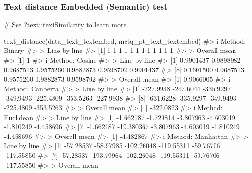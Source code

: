 \documentclass[
  12pt,
  a4paper,
  oneside]{tesesusp}
\newenvironment{Shaded}{\begin{snugshade}}{\end{snugshade}}
\newcommand{\CommentTok}[1]{\textcolor[rgb]{0.37,0.37,0.37}{#1}}
\newcommand{\FunctionTok}[1]{\textcolor[rgb]{0.28,0.35,0.67}{#1}}
\newcommand{\NormalTok}[1]{\textcolor[rgb]{0.00,0.23,0.31}{#1}}
\begin{document}
\hypertarget{text-distance-embedded-semantic-test-1}{%
\subsubsection{Text distance \textbar{} Embedded (Semantic)
test}\label{text-distance-embedded-semantic-test-1}}

\begin{Shaded}
\begin{Highlighting}[numbers=left,,]
\CommentTok{\# See \textasciigrave{}?text::textSimilarity\textasciigrave{} to learn more.}

\FunctionTok{text\_distance}\NormalTok{(data\_text\_textembed, mctq\_pt\_text\_textembed)}
\CommentTok{\#\textgreater{} i Method: Binary}
\CommentTok{\#\textgreater{} \textgreater{} Line by line}
\CommentTok{\#\textgreater{}  [1] 1 1 1 1 1 1 1 1 1 1 1 1}
\CommentTok{\#\textgreater{} \textgreater{} Overall mean}
\CommentTok{\#\textgreater{} [1] 1}
\CommentTok{\#\textgreater{} i Method: Cosine}
\CommentTok{\#\textgreater{} \textgreater{} Line by line}
\CommentTok{\#\textgreater{}  [1] 0.9901437 0.9898982 0.9687513 0.9575260 0.9882873 0.9598702 0.9901437}
\CommentTok{\#\textgreater{}  [8] 0.1601500 0.9687513 0.9575260 0.9882873 0.9598702}
\CommentTok{\#\textgreater{} \textgreater{} Overall mean}
\CommentTok{\#\textgreater{} [1] 0.9066005}
\CommentTok{\#\textgreater{} i Method: Canberra}
\CommentTok{\#\textgreater{} \textgreater{} Line by line}
\CommentTok{\#\textgreater{}  [1] {-}227.9938 {-}247.6044 {-}335.9297 {-}349.9493 {-}225.4809 {-}353.5263 {-}227.9938}
\CommentTok{\#\textgreater{}  [8] {-}631.6228 {-}335.9297 {-}349.9493 {-}225.4809 {-}353.5263}
\CommentTok{\#\textgreater{} \textgreater{} Overall mean}
\CommentTok{\#\textgreater{} [1] {-}322.0823}
\CommentTok{\#\textgreater{} i Method: Euclidean}
\CommentTok{\#\textgreater{} \textgreater{} Line by line}
\CommentTok{\#\textgreater{}  [1]  {-}1.662187  {-}1.729814  {-}3.807963  {-}4.603019  {-}1.810249  {-}4.458696}
\CommentTok{\#\textgreater{}  [7]  {-}1.662187 {-}19.380367  {-}3.807963  {-}4.603019  {-}1.810249  {-}4.458696}
\CommentTok{\#\textgreater{} \textgreater{} Overall mean}
\CommentTok{\#\textgreater{} [1] {-}4.482867}
\CommentTok{\#\textgreater{} i Method: Manhattan}
\CommentTok{\#\textgreater{} \textgreater{} Line by line}
\CommentTok{\#\textgreater{}  [1]  {-}57.28537  {-}58.97985 {-}102.26048 {-}119.55311  {-}59.76706 {-}117.55850}
\CommentTok{\#\textgreater{}  [7]  {-}57.28537 {-}193.79964 {-}102.26048 {-}119.55311  {-}59.76706 {-}117.55850}
\CommentTok{\#\textgreater{} \textgreater{} Overall mean}

\end{Highlighting}
\end{Shaded}
\end{document}
